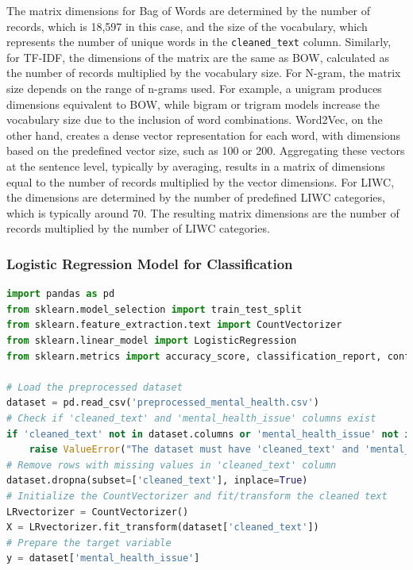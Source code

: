 \noindent
The matrix dimensions for Bag of Words are determined by the number of records, which is 18,597 in this case, and the size of the vocabulary, which represents the number of unique words in the \texttt{cleaned\_text} column. Similarly, for TF-IDF, the dimensions of the matrix are the same as BOW, calculated as the number of records multiplied by the vocabulary size. For N-gram, the matrix size depends on the range of n-grams used. For example, a unigram produces dimensions equivalent to BOW, while bigram or trigram models increase the vocabulary size due to the inclusion of word combinations. Word2Vec, on the other hand, creates a dense vector representation for each word, with dimensions based on the predefined vector size, such as 100 or 200. Aggregating these vectors at the sentence level, typically by averaging, results in a matrix of dimensions equal to the number of records multiplied by the vector dimensions. For LIWC, the dimensions are determined by the number of predefined LIWC categories, which is typically around 70. The resulting matrix dimensions are the number of records multiplied by the number of LIWC categories.


\subsubsection{Logistic Regression Model for Classification}
\begin{tcolorbox}[colback=gray!5!white, colframe=gray!80!black, boxrule=0.5pt, title=Logistic Regression for Mental Health Classification]
    \begin{lstlisting}[language=Python]
import pandas as pd
from sklearn.model_selection import train_test_split
from sklearn.feature_extraction.text import CountVectorizer
from sklearn.linear_model import LogisticRegression
from sklearn.metrics import accuracy_score, classification_report, confusion_matrix

# Load the preprocessed dataset
dataset = pd.read_csv('preprocessed_mental_health.csv')
# Check if 'cleaned_text' and 'mental_health_issue' columns exist
if 'cleaned_text' not in dataset.columns or 'mental_health_issue' not in dataset.columns:
    raise ValueError("The dataset must have 'cleaned_text' and 'mental_health_issue' columns.")
# Remove rows with missing values in 'cleaned_text' column
dataset.dropna(subset=['cleaned_text'], inplace=True)
# Initialize the CountVectorizer and fit/transform the cleaned text
LRvectorizer = CountVectorizer()
X = LRvectorizer.fit_transform(dataset['cleaned_text'])
# Prepare the target variable
y = dataset['mental_health_issue']
\end{lstlisting}
\end{tcolorbox}

